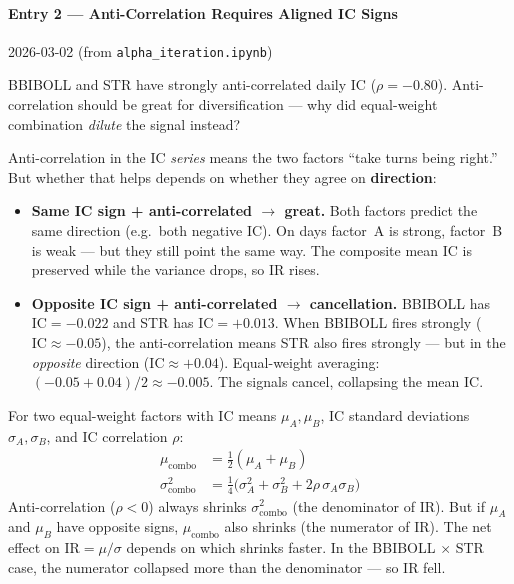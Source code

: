 \documentclass[a4paper, 11pt]{report}
\theoremstyle{definition}
\theoremstyle{remark}
\begin{document}
\paragraph{Entry 2 --- Anti-Correlation Requires Aligned IC Signs}
\label{exp:ic-sign-anticorr}
\begin{description}[style=nextline, leftmargin=1.8cm]
    \item[Date] 2026-03-02 \quad (from \texttt{alpha\_iteration.ipynb})
    \item[Question]
        BBIBOLL and STR have strongly anti-correlated daily IC
        ($\rho = -0.80$).
        Anti-correlation should be great for diversification ---
        why did equal-weight combination \emph{dilute} the signal instead?
    \item[Finding]
        Anti-correlation in the IC \emph{series} means the two factors
        ``take turns being right.''
        But whether that helps depends on whether they agree on
        \textbf{direction}:
        \begin{itemize}[nosep]
            \item \textbf{Same IC sign + anti-correlated $\boldsymbol{\to}$ great.}
                  Both factors predict the same direction (e.g.\ both negative IC).
                  On days factor~A is strong, factor~B is weak --- but they still
                  point the same way.  The composite mean IC is preserved while the
                  variance drops, so IR rises.
            \item \textbf{Opposite IC sign + anti-correlated $\boldsymbol{\to}$ cancellation.}
                  BBIBOLL has $\mathrm{IC} = -0.022$ and STR has
                  $\mathrm{IC} = +0.013$.
                  When BBIBOLL fires strongly ($\mathrm{IC} \approx -0.05$),
                  the anti-correlation means STR also fires strongly ---
                  but in the \emph{opposite} direction ($\mathrm{IC} \approx +0.04$).
                  Equal-weight averaging: $(-0.05 + 0.04)/2 \approx -0.005$.
                  The signals cancel, collapsing the mean IC.
        \end{itemize}

    \item[The Math]
        For two equal-weight factors with IC means $\mu_A, \mu_B$,
        IC standard deviations $\sigma_A, \sigma_B$, and IC correlation $\rho$:
        \begin{align*}
            \mu_{\text{combo}}   &= \tfrac{1}{2}(\mu_A + \mu_B) \\
            \sigma^2_{\text{combo}} &= \tfrac{1}{4}
                \bigl(\sigma_A^2 + \sigma_B^2 + 2\rho\,\sigma_A\sigma_B\bigr)
        \end{align*}
        Anti-correlation ($\rho < 0$) always shrinks $\sigma^2_{\text{combo}}$
        (the denominator of IR).
        But if $\mu_A$ and $\mu_B$ have opposite signs,
        $\mu_{\text{combo}}$ also shrinks (the numerator of IR).
        The net effect on $\mathrm{IR} = \mu/\sigma$ depends on which
        shrinks faster.  In the BBIBOLL $\times$ STR case, the numerator
        collapsed more than the denominator --- so IR fell.


\end{description}
\end{document}
